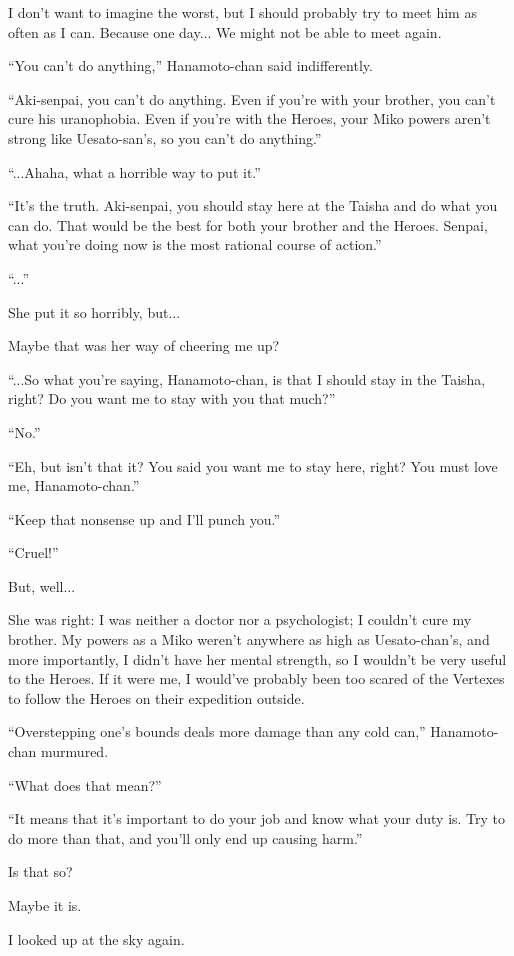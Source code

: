 I don't want to imagine the worst, but I should probably try to meet him as often as I can. Because one day... We might not be able to meet again.

``You can't do anything,''  Hanamoto-chan said indifferently.

``Aki-senpai, you can't do anything. Even if you're with your brother, you can't cure his uranophobia. Even if you're with the Heroes, your Miko powers aren't strong like Uesato-san's, so you can't do anything.''

``...Ahaha, what a horrible way to put it.''

``It's the truth. Aki-senpai, you should stay here at the Taisha and do what you can do. That would be the best for both your brother and the Heroes. Senpai, what you're doing now is the most rational course of action.''

``...''

She put it so horribly, but...

Maybe that was her way of cheering me up?

``...So what you're saying, Hanamoto-chan, is that I should stay in the Taisha, right? Do you want me to stay with you that much?''

``No.''

``Eh, but isn't that it? You said you want me to stay here, right? You must love me, Hanamoto-chan.''

``Keep that nonsense up and I'll punch you.''

``Cruel!''

But, well...

She was right: I was neither a doctor nor a psychologist; I couldn't cure my brother. My powers as a Miko weren't anywhere as high as Uesato-chan's, and more importantly, I didn't have her mental strength, so I wouldn't be very useful to the Heroes. If it were me, I would've probably been too scared of the Vertexes to follow the Heroes on their expedition outside.

``Overstepping one's bounds deals more damage than any cold can,'' Hanamoto-chan murmured.

``What does that mean?''

``It means that it's important to do your job and know what your duty is. Try to do more than that, and you'll only end up causing harm.''

Is that so?

Maybe it is.

I looked up at the sky again.

